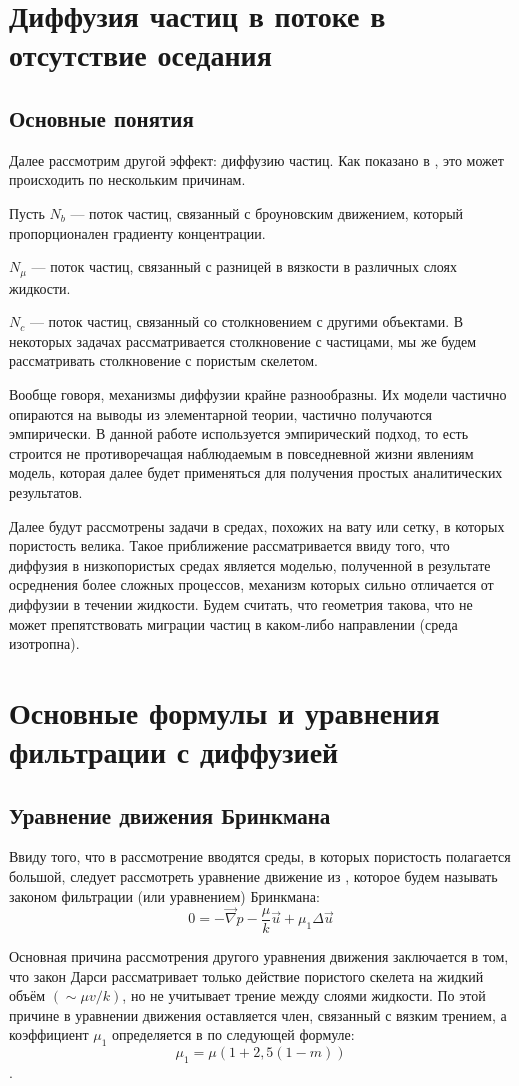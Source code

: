 \section{Диффузия частиц в потоке в отсутствие оседания}
\subsection{Основные понятия}
\par Далее рассмотрим другой эффект: диффузию частиц. Как показано в \cite{phillips}, это может происходить по нескольким причинам.
\par Пусть $N_{b}$ --- поток частиц, связанный с броуновским движением, который пропорционален градиенту концентрации.
\par $N_{\mu}$ --- поток частиц, связанный с разницей в вязкости в различных слоях жидкости.
\par $N_{c}$ --- поток частиц, связанный со столкновением с другими объектами. В некоторых задачах рассматривается столкновение с частицами, мы же будем рассматривать столкновение с пористым скелетом.
\par Вообще говоря, механизмы диффузии крайне разнообразны. Их модели частично опираются на выводы из элементарной теории, частично  получаются эмпирически. В данной работе используется эмпирический подход, то есть строится не противоречащая наблюдаемым в повседневной жизни явлениям модель, которая далее будет применяться для получения простых аналитических результатов.
\par Далее будут рассмотрены задачи в средах, похожих на вату или сетку, в которых пористость велика. Такое приближение рассматривается ввиду того, что диффузия в низкопористых средах является моделью, полученной в результате осреднения более сложных процессов, механизм которых сильно отличается от диффузии в течении жидкости. Будем считать, что геометрия такова, что не может препятствовать миграции частиц в каком-либо направлении (среда изотропна).
\pagebreak
\section{Основные формулы и уравнения фильтрации с диффузией}
\subsection{Уравнение движения Бринкмана}
\par Ввиду того, что в рассмотрение вводятся среды, в которых пористость полагается большой, следует рассмотреть уравнение движение из \cite{brinkman}, которое будем называть законом фильтрации (или уравнением) Бринкмана: $$0 = - \vec{\nabla}p-\frac{\mu}{k}\vec{u}+\mu_{1}\Delta\vec{u}$$
\par Основная причина рассмотрения другого уравнения движения заключается в том, что закон Дарси рассматривает только действие пористого скелета на жидкий объём $(\sim \mu v/k)$, но не учитывает трение между слоями жидкости. По этой причине в уравнении движения оставляется член, связанный с вязким трением, а коэффициент $\mu_{1}$ определяется в \cite{brinkman} по следующей формуле: $$\mu_{1}=\mu(1+2{,}5 (1-m))$$.
